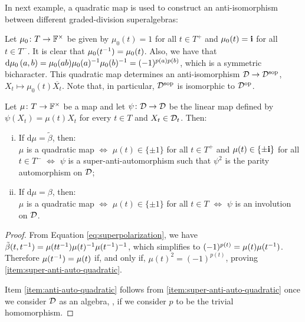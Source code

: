 In next example, a quadratic map is used to construct an anti-isomorphism between different graded-division superalgebras:

\begin{ex}\label{ex:quadratic-form-polarization-parity}
	Let $\mu_0\colon T \to \mathbb{F}^\times$ be given by $\mu_0(t) = 1$ for all $t\in T^+$ and $\mu_0(t) = \mathbf{i}$ for all $t\in T^-$.
	It is clear that $\mu_0(t^{-1}) = \mu_0(t)$.
	Also, we have that $\mathrm{d}\mu_0 \, (a,b) = \mu_0(ab) \mu_0(a)^{-1} \mu_0(b)^{-1} = (-1)^{p(a)p(b)}$, which is a symmetric bicharacter. 
	This quadratic map determines an anti-isomorphism $\mathcal{D} \to \mathcal{D}^{\mathrm{sop}}$, $X_t\mapsto \mu_0(t)\overline{X_t}$. 
	Note that, in particular, $\mathcal{D}^{\mathrm{sop}}$ is isomorphic to $\mathcal{D}^{\mathrm{op}}$.
\end{ex}

\begin{lemma}\label{lemma:quadratic-form-involutions}
	Let $\mu\colon T \to \mathbb{F}^\times$ be a map and let $\psi\colon \mathcal{D} \to \mathcal{D}$ be the linear map defined by
	$\psi(X_t) = \mu(t) X_t$ for every $t\in T$ and $X_t \in \mathcal{D}_t$.
	Then:
	\begin{enumerate}[(i)]
		\item If $\mathrm{d}\mu = \tilde\beta$, then: \\
		      $\mu$ is a quadratic map $\iff$ $\mu(t)\in \{ \pm 1 \}$ for all $t \in T^+$ and $\mu(t)\in \{ \pm \mathbf{i} \}$ for all $t \in T^-$ $\iff$ $\psi$ is a super-anti-automorphism such that $\psi^2$ is the parity automorphism on $\mathcal{D}$; \label{item:super-anti-auto-quadratic}
		\item If $\mathrm{d}\mu = \beta$, then:\\
		      $\mu$ is a quadratic map $\iff$ $\mu(t) \in \{\pm 1\}$ for all $t\in T$ $\iff$ $\psi$ is
		      an involution on $\mathcal{D}$. \label{item:anti-auto-quadratic}
	\end{enumerate}
\end{lemma}

\begin{proof}
	From Equation \eqref{eq:superpolarization}, we have $\tilde\beta (t, t^{-1}) = \mu (tt^{-1}) \mu(t)^{-1} \mu(t^{-1})^{-1}$, which simplifies to $(-1)^{p(t)} = \mu(t)\mu(t^{-1})$.
	Therefore $\mu(t^{-1}) = \mu(t)$ if, and only if, $\mu(t)^2 = (-1)^{p(t)}$, proving \eqref{item:super-anti-auto-quadratic}.

	Item \eqref{item:anti-auto-quadratic} follows from \eqref{item:super-anti-auto-quadratic} once we consider $\mathcal{D}$ as an algebra, \ie, if we consider $p$ to be the trivial homomorphism.
\end{proof}

